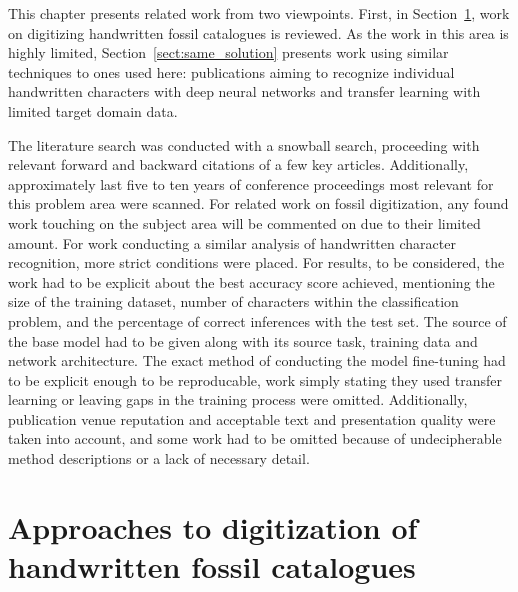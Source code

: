 \documentclass[english,twoside,openright]{UH_DS_MSc}
\begin{document}
This chapter presents related work from two viewpoints. First, in Section~\ref{sect:related_same_problem},
work on digitizing handwritten fossil catalogues is reviewed. As the work 
in this area is highly limited, Section~\ref{sect:same_solution} presents work using similar techniques 
to ones used here: publications aiming to recognize individual handwritten characters 
with deep neural networks and transfer learning with limited target domain data.


The literature search was conducted with a snowball search, proceeding with relevant forward and backward citations 
of a few key articles. Additionally, approximately last five to ten years of conference proceedings most relevant for this problem area were 
scanned. For related work on fossil digitization, any found work touching on the subject area will be commented on due to their 
limited amount. For work conducting a similar analysis of handwritten character recognition, more strict conditions were placed. 
For results, to be considered, the work had to be explicit about the best accuracy score achieved,
mentioning the size of the training dataset, number of characters within the classification problem, and the percentage 
of correct inferences with the test set. The source of the base model had to be given along with its source task, training data
and network architecture. The exact method of conducting the model fine-tuning had to be explicit enough to be reproducable,
work simply stating they used transfer learning or leaving gaps in the training process were omitted. Additionally, 
publication venue reputation and acceptable text and presentation quality were taken into account, and some work had to be
omitted because of undecipherable method descriptions or a lack of necessary detail.


\section{Approaches to digitization of handwritten fossil catalogues}
\label{sect:related_same_problem}
\end{document}
